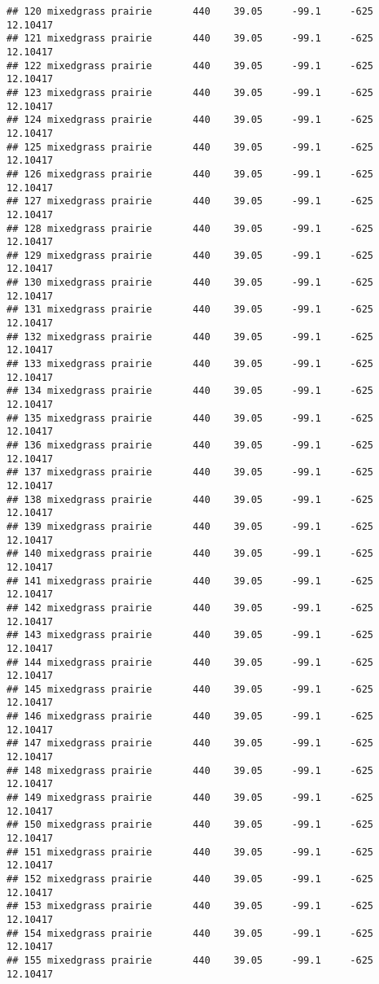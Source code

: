 \documentclass[]{article}
\begin{document}
\begin{verbatim}
## 120 mixedgrass prairie       440    39.05     -99.1     -625 12.10417
## 121 mixedgrass prairie       440    39.05     -99.1     -625 12.10417
## 122 mixedgrass prairie       440    39.05     -99.1     -625 12.10417
## 123 mixedgrass prairie       440    39.05     -99.1     -625 12.10417
## 124 mixedgrass prairie       440    39.05     -99.1     -625 12.10417
## 125 mixedgrass prairie       440    39.05     -99.1     -625 12.10417
## 126 mixedgrass prairie       440    39.05     -99.1     -625 12.10417
## 127 mixedgrass prairie       440    39.05     -99.1     -625 12.10417
## 128 mixedgrass prairie       440    39.05     -99.1     -625 12.10417
## 129 mixedgrass prairie       440    39.05     -99.1     -625 12.10417
## 130 mixedgrass prairie       440    39.05     -99.1     -625 12.10417
## 131 mixedgrass prairie       440    39.05     -99.1     -625 12.10417
## 132 mixedgrass prairie       440    39.05     -99.1     -625 12.10417
## 133 mixedgrass prairie       440    39.05     -99.1     -625 12.10417
## 134 mixedgrass prairie       440    39.05     -99.1     -625 12.10417
## 135 mixedgrass prairie       440    39.05     -99.1     -625 12.10417
## 136 mixedgrass prairie       440    39.05     -99.1     -625 12.10417
## 137 mixedgrass prairie       440    39.05     -99.1     -625 12.10417
## 138 mixedgrass prairie       440    39.05     -99.1     -625 12.10417
## 139 mixedgrass prairie       440    39.05     -99.1     -625 12.10417
## 140 mixedgrass prairie       440    39.05     -99.1     -625 12.10417
## 141 mixedgrass prairie       440    39.05     -99.1     -625 12.10417
## 142 mixedgrass prairie       440    39.05     -99.1     -625 12.10417
## 143 mixedgrass prairie       440    39.05     -99.1     -625 12.10417
## 144 mixedgrass prairie       440    39.05     -99.1     -625 12.10417
## 145 mixedgrass prairie       440    39.05     -99.1     -625 12.10417
## 146 mixedgrass prairie       440    39.05     -99.1     -625 12.10417
## 147 mixedgrass prairie       440    39.05     -99.1     -625 12.10417
## 148 mixedgrass prairie       440    39.05     -99.1     -625 12.10417
## 149 mixedgrass prairie       440    39.05     -99.1     -625 12.10417
## 150 mixedgrass prairie       440    39.05     -99.1     -625 12.10417
## 151 mixedgrass prairie       440    39.05     -99.1     -625 12.10417
## 152 mixedgrass prairie       440    39.05     -99.1     -625 12.10417
## 153 mixedgrass prairie       440    39.05     -99.1     -625 12.10417
## 154 mixedgrass prairie       440    39.05     -99.1     -625 12.10417
## 155 mixedgrass prairie       440    39.05     -99.1     -625 12.10417

\end{verbatim}
\end{document}
